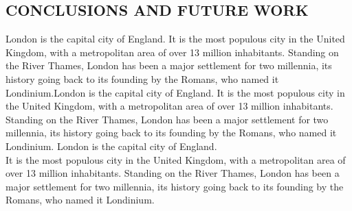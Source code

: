\begin{center}
	\justifying
	\chapter{CONCLUSIONS AND FUTURE WORK}
	London is the capital city of England. It is the most populous city in the United Kingdom, with a metropolitan area of over 13 million inhabitants. Standing on the River Thames, London has been a major settlement for two millennia, its history going back to its founding by the Romans, who named it Londinium.London is the capital city of England. It is the most populous city in the United Kingdom, with a metropolitan area of over 13 million inhabitants. Standing on the River Thames, London has been a major settlement for two millennia, its history going back to its founding by the Romans, who named it Londinium. London is the capital city of England.\\
	
	It is the most populous city in the United Kingdom, with a metropolitan area of over 13 million inhabitants. Standing on the River Thames, London has been a major settlement for two millennia, its history going back to its founding by the Romans, who named it Londinium.
\end{center}